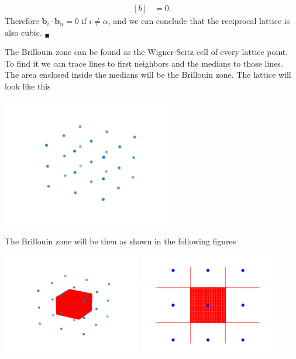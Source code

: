\begin{questions}
\begin{solution}
\begin{equation}
\begin{aligned}[b]
       &=0.
    \end{aligned}
  \end{equation}
  Therefore $\bm{b}_i \cdot \bm{b}_\alpha = 0$ if $i\neq \alpha$, and we can conclude that the reciprocal lattice is also cubic. $_\blacksquare$
\end{solution}
\begin{solution}
  The Brillouin zone can be found as the Wigner-Seitz cell of every lattice point. To find it we can trace lines to first neighbors and the medians to those lines. The area enclosed inside the medians will be the Brillouin zone.
  The lattice will look like this
  \begin{center}
  \includegraphics[width=75mm]{cell}
\end{center}
   \label{cell}\vspace{0.5cm}
   The Brillouin zone will be then as shown in the following figures
   \begin{center}
   \includegraphics[width=60mm]{brill}
   \includegraphics[width=60mm]{contour}
 \end{center}
    \label{cell}\vspace{0.5cm}


\end{solution}
\end{questions}

